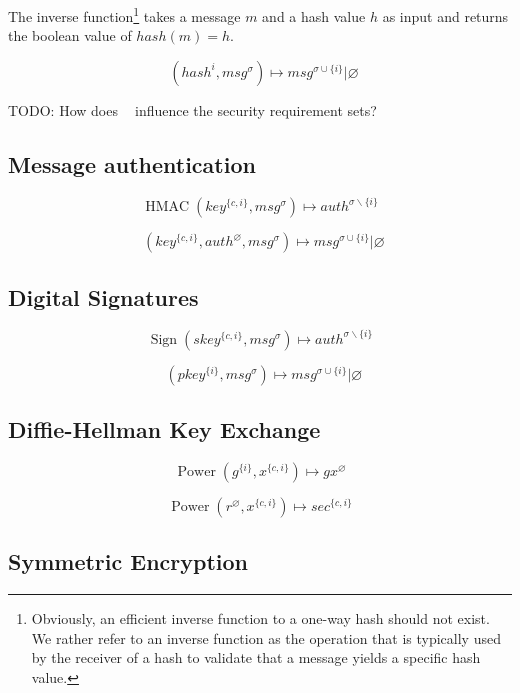 \documentclass[a4paper]{article}
\DeclareMathOperator{\hashvrfy}{Verify_{Hash}}
\DeclareMathOperator{\hmac}{HMAC}
\DeclareMathOperator{\hmacvrfy}{Verify_{HMAC}}
\DeclareMathOperator{\sign}{Sign}
\DeclareMathOperator{\signvrfy}{Verify_{Sig}}
\DeclareMathOperator{\power}{Power}
\newcommand{\TODO}[1]{\small\noindent\color{red} TODO: #1\color{black}}
\newcommand{\emptysec}{\varnothing}
\newcommand{\secminus}{\smallsetminus}
\begin{document}
The inverse function\footnote{Obviously, an efficient inverse function to a
one-way hash should not exist. We rather refer to an inverse function as the
operation that is typically used by the receiver of a hash to validate that a
message yields a specific hash value.} takes a message $m$ and a hash
value $h$ as input and returns the boolean value of $hash(m) = h$.

$$\hashvrfy(hash^{i}, msg^\sigma) \mapsto msg^{\sigma\cup\{i\}} | \emptysec$$

\TODO{How does $\hashvrfy$ influence the security requirement sets?}

\subsection{Message authentication}

$$\hmac(key^{\{c,i\}}, msg^\sigma) \mapsto auth^{\sigma\secminus{\{i\}}}$$

$$\hmacvrfy(key^{\{c,i\}}, auth^\emptysec, msg^\sigma) \mapsto msg^{\sigma\cup\{i\}} | \emptysec$$

%

\subsection{Digital Signatures}

$$\sign(skey^{\{c,i\}}, msg^\sigma) \mapsto auth^{\sigma\secminus\{i\}}$$

$$\signvrfy(pkey^{\{i\}}, msg^\sigma) \mapsto msg^{\sigma\cup\{i\}} | \emptysec$$

\subsection{Diffie-Hellman Key Exchange}

$$\power(g^{\{i\}}, x^{\{c,i\}}) \mapsto gx^\emptysec$$

$$\power(r^\emptysec, x^{\{c,i\}}) \mapsto sec^{\{c,i\}} $$

\subsection{Symmetric Encryption}
\end{document}
